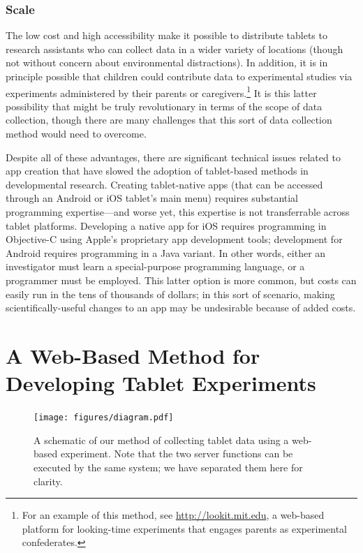 \documentclass[man,noapacite]{apa2}
\begin{document}
\subsubsection{Scale} The low cost and high accessibility make it possible to distribute tablets to research assistants who can collect data in a wider variety of locations (though not without concern about environmental distractions). In addition, it is in principle possible that children could contribute data to experimental studies via experiments administered by their parents or caregivers.\footnote{For an example of this method, see \url{http://lookit.mit.edu}, a web-based platform for looking-time experiments that engages parents as experimental confederates.} It is this latter possibility that might be truly revolutionary in terms of the scope of data collection, though there are many challenges that this sort of data collection method would need to overcome.

Despite all of these advantages, there are significant technical issues related to app creation that have slowed the adoption of tablet-based methods in developmental research. Creating tablet-native apps (that can be accessed through an Android or iOS tablet's main menu) requires substantial programming expertise---and worse yet, this expertise is not transferrable across tablet platforms. Developing a native app for iOS requires programming in Objective-C using Apple's proprietary app development tools; development for Android requires programming in a Java variant. In other words, either an investigator must learn a special-purpose programming language, or a programmer must be employed. This latter option is more common, but costs can easily run in the tens of thousands of dollars; in this sort of scenario, making scientifically-useful changes to an app may be undesirable because of added costs. 


\section{A Web-Based Method for Developing Tablet Experiments}


\begin{figure}[t] 
  \begin{center} 
    \texttt{[image: figures/diagram.pdf]} 
    \caption{\label{fig:diagram} A schematic of our method of collecting tablet data using a web-based experiment. Note that the two server functions can be executed by the same system; we have separated them here for clarity.}
  \end{center} 
\end{figure}
\end{document}
